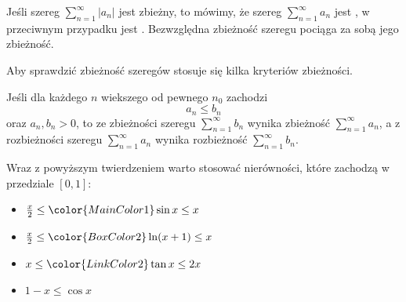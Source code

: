 Jeśli szereg $\sum_{n=1}^\infty |a_n|$ jest zbieżny, to mówimy, że szereg $\sum_{n=1}^\infty a_n$ jest , w przeciwnym przypadku jest . Bezwzględna zbieżność szeregu pociąga za sobą jego zbieżność.

Aby sprawdzić zbieżność szeregów stosuje się kilka kryteriów zbieżności.

\begin{theorem}
    Jeśli dla każdego $n$ wiekszego od pewnego $n_0$ zachodzi
    \[ a_n \leq b_n \]
    oraz $a_n, b_n > 0$, to ze zbieżności szeregu $\sum_{n=1}^\infty b_n$ wynika zbieżność $\sum_{n=1}^\infty a_n$, a z rozbieżności szeregu $\sum_{n=1}^\infty a_n$ wynika rozbieżność $\sum_{n=1}^\infty b_n$.
\end{theorem}

\begin{remark*}
    \begin{multicols}{2}
    Wraz z powyższym twierdzeniem warto stosować nierówności, które zachodzą w przedziale $[0,1]$:
    \begin{itemize}
        \item $\frac{x}{2} \leq {\color{MainColor1} \sin{x}} \leq x$
        \item $\frac{x}{2} \leq {\color{BoxColor2} \ln(x + 1)} \leq x$
        \item $x \leq {\color{LinkColor2} \tan{x}} \leq 2x$
        \item $1 - x \leq \cos{x}$
    \end{itemize}
    \hspace{2em}

    \end{multicols}
\end{remark*}

